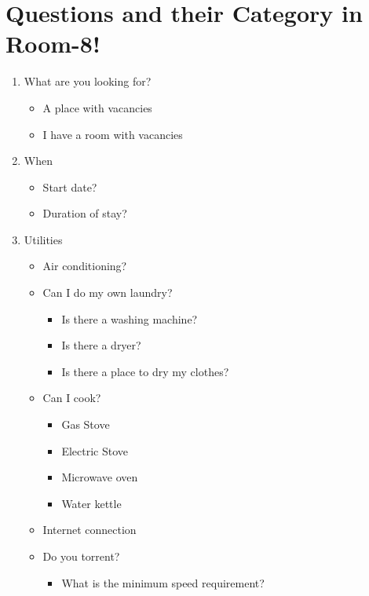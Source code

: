 \documentclass[journal]{IEEEtran}
\begin{document}
\section{Questions and their Category in Room-8!}
\begin{enumerate}

    \item What are you looking for?
    \begin{itemize}
        \item A place with vacancies
        \item I have a room with vacancies
    \end{itemize}

    \item When
    \begin{itemize}
        \item Start date?
        \item Duration of stay?
    \end{itemize}

    \item Utilities
    \begin{itemize}
        \item Air conditioning?
        \item Can I do my own laundry?
        \begin{itemize}
            \item Is there a washing machine?
            \item Is there a dryer?
            \item Is there a place to dry my clothes?
        \end{itemize}
        \item Can I cook?
        \begin{itemize}
            \item Gas Stove
            \item Electric Stove
            \item Microwave oven
            \item Water kettle
        \end{itemize}
        \item Internet connection
        \item Do you torrent?
        \begin{itemize}
            \item What is the minimum speed requirement?
        \end{itemize}
    \end{itemize}


\end{enumerate}
\end{document}
